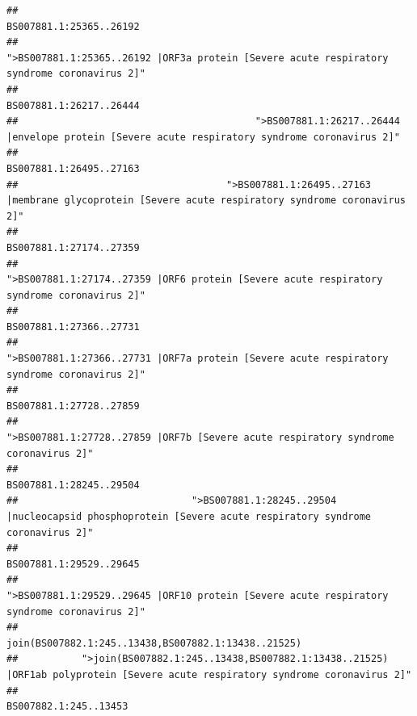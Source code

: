 \documentclass[
]{article}
\begin{document}
\begin{verbatim}
##                                                                                                                BS007881.1:25365..26192 
##                                            ">BS007881.1:25365..26192 |ORF3a protein [Severe acute respiratory syndrome coronavirus 2]" 
##                                                                                                                BS007881.1:26217..26444 
##                                         ">BS007881.1:26217..26444 |envelope protein [Severe acute respiratory syndrome coronavirus 2]" 
##                                                                                                                BS007881.1:26495..27163 
##                                    ">BS007881.1:26495..27163 |membrane glycoprotein [Severe acute respiratory syndrome coronavirus 2]" 
##                                                                                                                BS007881.1:27174..27359 
##                                             ">BS007881.1:27174..27359 |ORF6 protein [Severe acute respiratory syndrome coronavirus 2]" 
##                                                                                                                BS007881.1:27366..27731 
##                                            ">BS007881.1:27366..27731 |ORF7a protein [Severe acute respiratory syndrome coronavirus 2]" 
##                                                                                                                BS007881.1:27728..27859 
##                                                    ">BS007881.1:27728..27859 |ORF7b [Severe acute respiratory syndrome coronavirus 2]" 
##                                                                                                                BS007881.1:28245..29504 
##                              ">BS007881.1:28245..29504 |nucleocapsid phosphoprotein [Severe acute respiratory syndrome coronavirus 2]" 
##                                                                                                                BS007881.1:29529..29645 
##                                            ">BS007881.1:29529..29645 |ORF10 protein [Severe acute respiratory syndrome coronavirus 2]" 
##                                                                                    join(BS007882.1:245..13438,BS007882.1:13438..21525) 
##           ">join(BS007882.1:245..13438,BS007882.1:13438..21525) |ORF1ab polyprotein [Severe acute respiratory syndrome coronavirus 2]" 
##                                                                                                                  BS007882.1:245..13453 

\end{verbatim}
\end{document}
